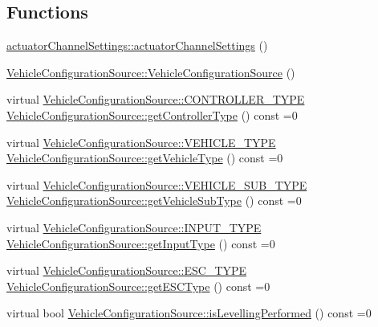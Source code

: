 \subsection*{\-Functions}
\begin{DoxyCompactItemize}
\item 
\hyperlink{group___vehicle_configuration_source_gafb0dd689dc5216c230c118b385dc1b56}{actuator\-Channel\-Settings\-::actuator\-Channel\-Settings} ()
\item 
\hyperlink{group___vehicle_configuration_source_ga56e48ed960f6d5fd24d03e01caaa460b}{\-Vehicle\-Configuration\-Source\-::\-Vehicle\-Configuration\-Source} ()
\item 
virtual \*
\hyperlink{group___vehicle_configuration_source_ga3cfce2b0a501a6fdb7a0ae408ba63556}{\-Vehicle\-Configuration\-Source\-::\-C\-O\-N\-T\-R\-O\-L\-L\-E\-R\-\_\-\-T\-Y\-P\-E} \hyperlink{group___vehicle_configuration_source_ga7c0552b72e10b1c4f84ffcb926f1bc87}{\-Vehicle\-Configuration\-Source\-::get\-Controller\-Type} () const =0
\item 
virtual \*
\hyperlink{group___vehicle_configuration_source_gaa97253587c69ba0d23535abdc42fad43}{\-Vehicle\-Configuration\-Source\-::\-V\-E\-H\-I\-C\-L\-E\-\_\-\-T\-Y\-P\-E} \hyperlink{group___vehicle_configuration_source_gacfd79047f8c186731eca58056dbb979d}{\-Vehicle\-Configuration\-Source\-::get\-Vehicle\-Type} () const =0
\item 
virtual \*
\hyperlink{group___vehicle_configuration_source_gaa22bfa88d750f2b46f66702a723e8342}{\-Vehicle\-Configuration\-Source\-::\-V\-E\-H\-I\-C\-L\-E\-\_\-\-S\-U\-B\-\_\-\-T\-Y\-P\-E} \hyperlink{group___vehicle_configuration_source_gab3c8f49e774f0b679b21f6f281b3b803}{\-Vehicle\-Configuration\-Source\-::get\-Vehicle\-Sub\-Type} () const =0
\item 
virtual \*
\hyperlink{group___vehicle_configuration_source_gae10edd59d3a32fad8c531a1d2346115c}{\-Vehicle\-Configuration\-Source\-::\-I\-N\-P\-U\-T\-\_\-\-T\-Y\-P\-E} \hyperlink{group___vehicle_configuration_source_gaa63bd09fcc8f30102f720cad79f99e7f}{\-Vehicle\-Configuration\-Source\-::get\-Input\-Type} () const =0
\item 
virtual \*
\hyperlink{group___vehicle_configuration_source_ga734c812e17554d4f7ca67f1008abdd6c}{\-Vehicle\-Configuration\-Source\-::\-E\-S\-C\-\_\-\-T\-Y\-P\-E} \hyperlink{group___vehicle_configuration_source_ga748ecf5409ded5e291f093a48cea7637}{\-Vehicle\-Configuration\-Source\-::get\-E\-S\-C\-Type} () const =0
\item 
virtual bool \hyperlink{group___vehicle_configuration_source_ga18b570857c0bc2d0e77ad0be0a324f37}{\-Vehicle\-Configuration\-Source\-::is\-Levelling\-Performed} () const =0

\end{DoxyCompactItemize}
